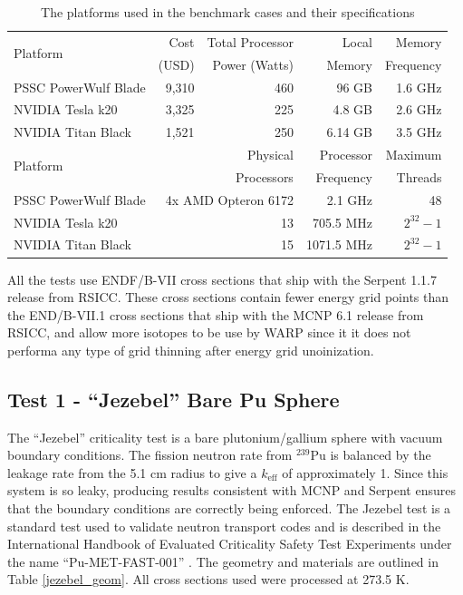 \documentclass[preprint,12pt]{elsarticle}
\begin{document}
\begin{table}[h]
\centering
\caption{The platforms used in the benchmark cases and their specifications}
\label{platform_table}
\small
\begin{tabular}{| l | r | r | r | r |}
\hline
\multirow{2}{*}{Platform} &  Cost   &Total Processor  & Local       & Memory     \\
                                       & (USD)  & Power (Watts) & Memory  & Frequency \\
\hline
PSSC PowerWulf Blade       &    9,310   & 460 &  96 GB        &  1.6 GHz                    \\
\hline
NVIDIA Tesla k20         &    3,325     & 225 &  4.8  GB      &  2.6 GHz                  \\
\hline
NVIDIA Titan Black       &     1,521   & 250 &  6.14 GB        & 3.5 GHz              \\
\hline
\hline
\hline
\multirow{2}{*}{Platform}  &  \multicolumn{2}{r|}{Physical }     & Processor  & Maximum \\
                                        & \multicolumn{2}{r|}{Processors}  & Frequency  & Threads \\
\hline
PSSC PowerWulf Blade       &   \multicolumn{2}{r|}{4x AMD Opteron 6172 }  &  2.1 GHz     &  48           \\
\hline
NVIDIA Tesla k20         &       \multicolumn{2}{r|}{13}   &  705.5 MHz     &  $2^{32}-1$           \\
\hline
NVIDIA Titan Black       &      \multicolumn{2}{r|}{ 15 }  &  1071.5 MHz     & $2^{32}-1$           \\
\hline

\end{tabular}
\end{table}

All the tests use ENDF/B-VII cross sections that ship with the Serpent 1.1.7 release from RSICC.  These cross sections contain fewer energy grid points than the END/B-VII.1 cross sections that ship with the MCNP 6.1 release from RSICC, and allow more isotopes to be use by WARP since it it does not performa any type of grid thinning after energy grid unoinization.


\subsection{Test 1 - ``Jezebel'' Bare Pu Sphere}

The ``Jezebel'' criticality test is a bare plutonium/gallium sphere with vacuum boundary conditions.   The fission neutron rate from $^{239}$Pu is balanced by the leakage rate from the 5.1 cm radius to give a $k_\mathrm{eff}$ of approximately 1.  Since this system is so leaky, producing results consistent with MCNP and Serpent ensures that the boundary conditions are correctly being enforced.  The Jezebel test is a standard test used to validate neutron transport codes and is described in the International Handbook of Evaluated Criticality Safety Test Experiments under the name ``Pu-MET-FAST-001'' \cite{bench_handbook}.  The geometry and materials are outlined in Table \ref{jezebel_geom}.  All cross sections used were processed at 273.5 K.
\end{document}
